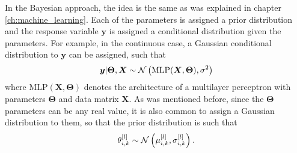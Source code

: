 %
%

In the Bayesian approach, the idea is the same as was explained in chapter \ref{ch:machine_learning}. Each of the parameters is assigned a prior distribution and the response variable $\boldsymbol{y}$ is assigned a conditional distribution given the parameters. For example, in the continuous case, a Gaussian conditional distribution to $\boldsymbol{y}$ can be assigned, such that
\begin{equation}
  \boldsymbol{y} | \boldsymbol{\Theta}, \boldsymbol{X} \sim \mathcal{N}\left( \mathrm{MLP}(\boldsymbol{X}, \boldsymbol{\Theta}), \sigma^2 \right)
\end{equation}
where $\mathrm{MLP}(\boldsymbol{X}, \boldsymbol{\Theta})$ denotes the architecture of a multilayer perceptron with parameters $\boldsymbol{\Theta}$ and data matrix $\boldsymbol{X}$. As was mentioned before, since the $\boldsymbol{\Theta}$ parameters can be any real value, it is also common to assign a Gaussian distribution to them, so that the prior distribution is such that
\begin{equation}
  \theta_{i,k}^{[l]} \sim \mathcal{N}\left( \mu_{i,k}^{[l]}, \sigma_{i,k}^{[l]} \right).
\end{equation}


